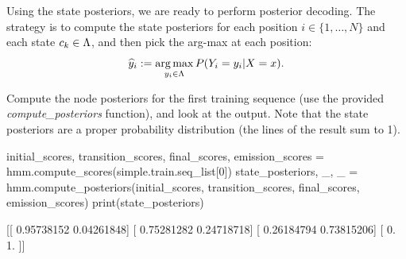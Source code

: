 Using the state posteriors, we are ready to perform posterior
decoding. 
The strategy is to compute the state posteriors 
for each position $i \in \{1,\ldots,N\}$
and each state $c_k \in \Lambda$, and 
then pick the arg-max at each position:
\begin{equation}
{\widehat y_i} := \operatorname*{arg\,max}_{y_i \in \Lambda} P(Y_i=y_i| X=x).
\end{equation}




\newpage
\begin{exercise}

Compute the node posteriors for the first training sequence (use the provided \emph{compute\_posteriors} function), and look at
the output. Note that the state posteriors are a proper
probability distribution (the lines of the result sum to 1).

\begin{python}
initial_scores, transition_scores, final_scores, emission_scores = hmm.compute_scores(simple.train.seq_list[0])
state_posteriors, _, _ = hmm.compute_posteriors(initial_scores,
                                                transition_scores,
                                                final_scores,
                                                emission_scores)
print(state_posteriors)

[[ 0.95738152  0.04261848]
 [ 0.75281282  0.24718718]
 [ 0.26184794  0.73815206]
 [ 0.          1.        ]]
\end{python}
\end{exercise}

